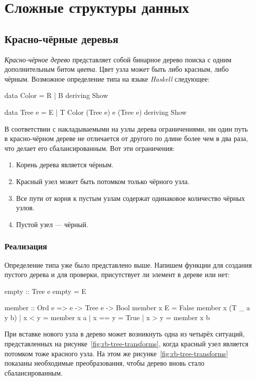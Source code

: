 \chapter{Сложные структуры данных}
\label{ch:advanced-ds}

\section{Красно-чёрные деревья}
\label{sec:rb-tree}
\emph{Красно-чёрное дерево} представляет собой бинарное дерево поиска с одним дополнительным битом \emph{цвета}. Цвет узла может быть либо красным, либо чёрным. Возможное определение типа на языке \emph{Haskell} следующее:
\begin{hslst}{}{}
data Color = R
           | B
           deriving Show

data Tree e = E
            | T Color (Tree e) e (Tree e)
            deriving Show
\end{hslst}

В соответствии с накладываемыми на узлы дерева ограничениями, ни один путь в красно-чёрном дереве не отличается от другого по длине более чем в два раза, что делает его сбалансированным. Вот эти ограничения:
\begin{enumerate}
  \item Корень дерева является чёрным.
  \item Красный узел может быть потомком только чёрного узла.
  \item Все пути от корня к пустым узлам содержат одинаковое количество чёрных узлов.
  \item Пустой узел — чёрный.
\end{enumerate}

\subsection{Реализация}
Определение типа уже было представлено выше. Напишем функции для создания пустого дерева и для проверки, присутствует ли элемент в дереве или нет:
\begin{hslst}{}{}
empty :: Tree e
empty = E

member :: Ord e => e -> Tree e -> Bool
member x E = False
member x (T _ a y b) | x <  y = member x a
                     | x == y = True
                     | x >  y = member x b
\end{hslst}

При вставке нового узла в дерево может возникнуть одна из четырёх ситуаций, представленных на рисунке~\ref{fig:rb-tree-transforms}, когда красный узел является потомком тоже красного узла. На этом же рисунке~\ref{fig:rb-tree-transforms} показаны необходимые преобразования, чтобы дерево вновь стало сбалансированным.

